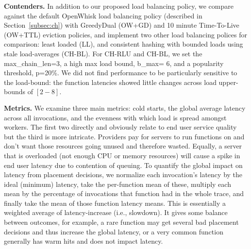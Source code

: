 \noindent \textbf{Contenders.}
In addition to our proposed load balancing policy, we compare against the default OpenWhisk load balancing policy (described in Section~\ref{subsec:ch}) with GreedyDual (OW+GD) and 10 minute Time-To-Live (OW+TTL) eviction policies, and implement two other load balancing polices for comparison: least loaded (LL), and consistent hashing with bounded loads using stale load-averages (CH-BL). 
For CH-RLU and CH-BL, we set the max\_chain\_len=3, a high max load bound, b\_max= 6, and a popularity threshold, p=20\%. 
We did not find performance to be particularly sensitive to the load-bound: the function latencies showed little changes across load upper-bounds of $[2-8]$. 




\noindent \textbf{Metrics.}
We examine three main metrics: cold starts, the global average latency across all invocations, and the evenness with which load is spread amongst workers.
%
The first two directly and obviously relate to end user service quality but the third is more intricate. 
Providers pay for servers to run functions on and don't want those resources going unused and therefore wasted.
Equally, a server that is overloaded (not enough CPU or memory resources) will cause a spike in end user latency due to contention of queuing.
%
To quantify the global impact on latency from placement decisions, we normalize each invocation's latency by the ideal (minimum) latency, take the per-function mean of these, multiply each mean by the percentage of invocations that function had in the whole trace, and finally take the mean of those function latency means.
This is essentially a weighted average of latency-increase (i.e., slowdown).
It gives some balance between outcomes, for example, a rare function may get several bad placement decisions and thus increase the global latency, or a very common function generally has warm hits and does not impact latency. 


